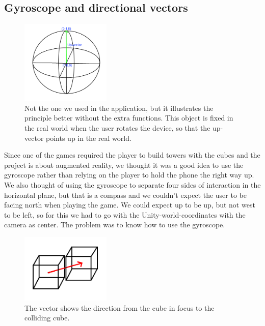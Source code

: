 \subsection{Gyroscope and directional vectors}

\begin{figure}
        \capstart
        \vspace{-20pt}
        \centering
        \includegraphics[width=0.38\textwidth]{images/GyroObjectModel.png}
        \vspace{-20pt}
        \caption[Model of the game-object used to get the direction up]{Not the one we used in the application, but it illustrates the principle better without the extra functions. This object is fixed in the real world when the user rotates the device, so that the up-vector points up in the real world.} 
        \label{fig:Gyro_model} 
        \vspace{-10pt}
\end{figure}

Since one of the games required the player to build towers with the cubes and the project is about augmented reality, we thought it was a good idea to use the gyroscope rather than relying on the player to hold the phone the right way up. We also thought of using the gyroscope to separate four sides of interaction in the horizontal plane, but that is a compass and we couldn't expect the user to be facing north when playing the game. We could expect up to be up, but not west to be left, so for this we had to go with the Unity-world-coordinates with the camera as center. The problem was to know how to use the gyroscope.\\

\begin{figure}
        \capstart
        \vspace{-20pt}
        \centering
        \includegraphics[width=0.38\textwidth]{images/CollisionDirectionObject.png}
        \vspace{-20pt}
        \caption[Model of the collision direction vector]{The vector shows the direction from the cube in focus to the colliding cube.} 
        \label{fig:Collision_Direction_model} 
        \vspace{-10pt}
\end{figure}

